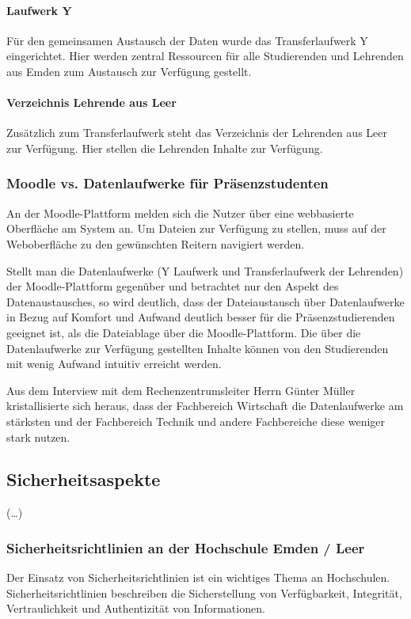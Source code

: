 \paragraph{Laufwerk Y}
Für den gemeinsamen Austausch der Daten wurde das Transferlaufwerk Y eingerichtet. Hier werden zentral Ressourcen für alle Studierenden und Lehrenden aus Emden zum Austausch zur Verfügung gestellt.

\paragraph{Verzeichnis Lehrende aus Leer}
Zusätzlich zum Transferlaufwerk steht das Verzeichnis der Lehrenden aus Leer  zur Verfügung. Hier stellen die Lehrenden Inhalte zur Verfügung.

\subsubsection{Moodle vs. Datenlaufwerke für Präsenzstudenten}
An der Moodle-Plattform melden sich die Nutzer über eine webbasierte Oberfläche am System an. Um Dateien zur Verfügung zu stellen, muss auf der Weboberfläche zu den gewünschten Reitern navigiert werden.

Stellt man die Datenlaufwerke (Y Laufwerk und Transferlaufwerk der Lehrenden) der Moodle-Plattform gegenüber  und betrachtet nur den Aspekt des Datenaustausches, so wird deutlich, dass der Dateiaustausch über   Datenlaufwerke in Bezug auf Komfort und Aufwand deutlich besser für die Präsenzstudierenden geeignet ist, als die Dateiablage über die Moodle-Plattform. Die über die Datenlaufwerke zur Verfügung gestellten Inhalte können von den Studierenden mit wenig Aufwand intuitiv erreicht werden.

Aus dem Interview mit dem Rechenzentrumsleiter Herrn Günter Müller kristallisierte sich heraus, dass der Fachbereich Wirtschaft die Datenlaufwerke am stärksten und der Fachbereich Technik und andere Fachbereiche diese weniger stark nutzen.

\subsection{Sicherheitsaspekte}
(\ldots)

\subsubsection{Sicherheitsrichtlinien an der Hochschule Emden / Leer}
Der Einsatz von Sicherheitsrichtlinien ist ein wichtiges Thema an Hochschulen. Sicherheitsrichtlinien beschreiben die Sicherstellung von Verfügbarkeit, Integrität, Vertraulichkeit und Authentizität von Informationen.


